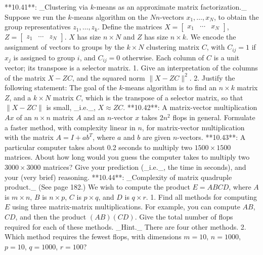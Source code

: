 

**10.41**: _Clustering via \(k\)-means as an approximate matrix factorization._ Suppose we run the \(k\)-means algorithm on the \(N\)\(n\)-vectors \(x_{1},\ldots,x_{N}\), to obtain the group representatives \(z_{1},\ldots,z_{k}\). Define the matrices \(X=[\begin{array}{cccc}x_{1}&\cdots&x_{N}\end{array}]\), \(Z=[\begin{array}{cccc}z_{1}&\cdots&z_{N}\end{array}]\). \(X\) has size \(n\times N\) and \(Z\) has size \(n\times k\). We encode the assignment of vectors to groups by the \(k\times N\) clustering matrix \(C\), with \(C_{ij}=1\) if \(x_{j}\) is assigned to group \(i\), and \(C_{ij}=0\) otherwise. Each column of \(C\) is a unit vector; its transpose is a selector matrix. 1. Give an interpretation of the columns of the matrix \(X-ZC\), and the squared norm \(\|X-ZC\|^{2}\). 2. Justify the following statement: The goal of the \(k\)-means algorithm is to find an \(n\times k\) matrix \(Z\), and a \(k\times N\) matrix \(C\), which is the transpose of a selector matrix, so that \(\|X-ZC\|\) is small, _i.e._, \(X\approx ZC\).
**10.42**: A matrix-vector multiplication \(Ax\) of an \(n\times n\) matrix \(A\) and an \(n\)-vector \(x\) takes \(2n^{2}\) flops in general. Formulate a faster method, with complexity linear in \(n\), for matrix-vector multiplication with the matrix \(A=I+ab^{T}\), where \(a\) and \(b\) are given \(n\)-vectors.
**10.43**: A particular computer takes about 0.2 seconds to multiply two \(1500\times 1500\) matrices. About how long would you guess the computer takes to multiply two \(3000\times 3000\) matrices? Give your prediction (_i.e._, the time in seconds), and your (very brief) reasoning.
**10.44**: _Complexity of matrix quadruple product._ (See page 182.) We wish to compute the product \(E=ABCD\), where \(A\) is \(m\times n\), \(B\) is \(n\times p\), \(C\) is \(p\times q\), and \(D\) is \(q\times r\). 1. Find all methods for computing \(E\) using three matrix-matrix multiplications. For example, you can compute \(AB\), \(CD\), and then the product \((AB)(CD)\). Give the total number of flops required for each of these methods. _Hint._ There are four other methods. 2. Which method requires the fewest flops, with dimensions \(m=10\), \(n=1000\), \(p=10\), \(q=1000\), \(r=100\)?